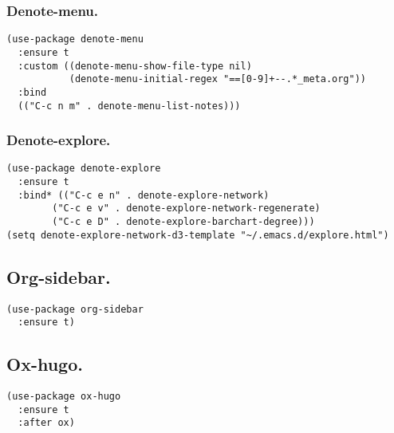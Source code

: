 \documentclass[11pt]{article}
\begin{document}
\subsubsection{Denote-menu.}
\label{sec:org286e5e9}
\begin{verbatim}
(use-package denote-menu
  :ensure t
  :custom ((denote-menu-show-file-type nil)
           (denote-menu-initial-regex "==[0-9]+--.*_meta.org"))
  :bind 
  (("C-c n m" . denote-menu-list-notes)))
\end{verbatim}
\subsubsection{Denote-explore.}
\label{sec:org653900b}
\begin{verbatim}
(use-package denote-explore
  :ensure t
  :bind* (("C-c e n" . denote-explore-network)
        ("C-c e v" . denote-explore-network-regenerate)
        ("C-c e D" . denote-explore-barchart-degree)))
(setq denote-explore-network-d3-template "~/.emacs.d/explore.html")
\end{verbatim}
\subsection{Org-sidebar.}
\label{sec:org76df66e}
\begin{verbatim}
(use-package org-sidebar
  :ensure t)
\end{verbatim}
\subsection{Ox-hugo.}
\label{sec:org29010a5}
\begin{verbatim}
(use-package ox-hugo
  :ensure t
  :after ox)
\end{verbatim}
\end{document}
